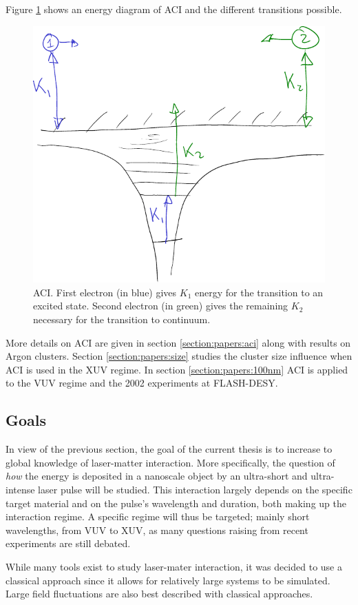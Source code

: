 Figure \ref{fig:ionization:aci} shows an energy diagram of ACI and the
different transitions possible.
\begin{figure}
 \centering
 \includegraphics[width=0.38\columnwidth]{figures/mockups/ionization_aci}
 \caption{ACI. First electron (in blue) gives $K_1$ energy for the transition
          to an excited state. Second electron (in green) gives the remaining
          $K_2$ necessary for the transition to continuum.}
 \label{fig:ionization:aci}
\end{figure}

More details on ACI are given in section \ref{section:papers:aci} along with
results on Argon clusters. Section \ref{section:papers:size} studies the cluster
size influence when ACI is used in the XUV regime. In section
\ref{section:papers:100nm} ACI is applied to the VUV regime and the
2002 experiments at FLASH-DESY.




\subsection{Goals}

In view of the previous section, the goal of the current thesis is to increase
to global knowledge of laser-matter interaction. More specifically, the
question of \textit{how} the energy is deposited in a nanoscale object by an
ultra-short and ultra-intense laser pulse will be studied. This interaction
largely depends on the specific target material and on the pulse's wavelength
and duration, both making up the interaction regime. A specific regime will
thus be targeted; mainly short wavelengths, from VUV to XUV, as many questions
raising from recent experiments are still debated.

While many tools exist to study laser-mater interaction, it was decided to use
a classical approach since it allows for relatively large systems to be
simulated. Large field fluctuations are also best described with
classical approaches\cite{Fennel2010}.

